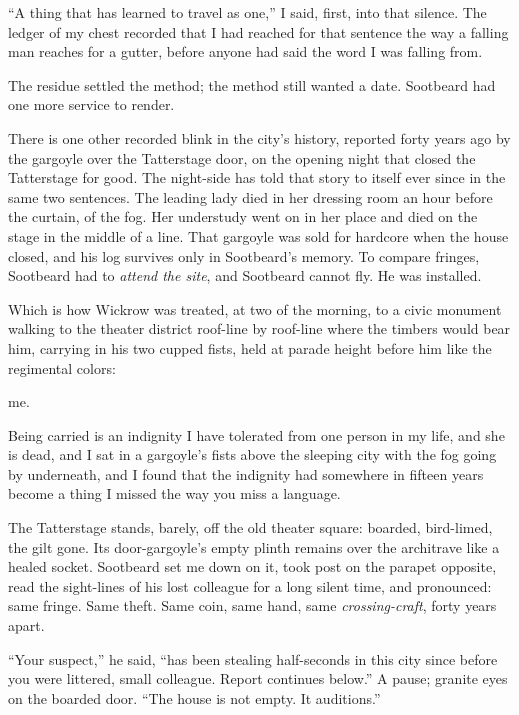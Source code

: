 ``A thing that has learned to travel as one,'' I said, first, into that silence. The ledger of my chest recorded that I had reached for that sentence the way a falling man reaches for a gutter, before anyone had said the word I was falling from.

\scenebreak

The residue settled the method; the method still wanted a date. Sootbeard had one more service to render.

There is one other recorded blink in the city's history, reported forty years ago by the gargoyle over the Tatterstage door, on the opening night that closed the Tatterstage for good. The night-side has told that story to itself ever since in the same two sentences. The leading lady died in her dressing room an hour before the curtain, of the fog. Her understudy went on in her place and died on the stage in the middle of a line. That gargoyle was sold for hardcore when the house closed, and his log survives only in Sootbeard's memory. To compare fringes, Sootbeard had to \emph{attend the site}, and Sootbeard cannot fly. He was installed.

Which is how Wickrow was treated, at two of the morning, to a civic monument walking to the theater district roof-line by roof-line where the timbers would bear him, carrying in his two cupped fists, held at parade height before him like the regimental colors:

me.

Being carried is an indignity I have tolerated from one person in my life, and she is dead, and I sat in a gargoyle's fists above the sleeping city with the fog going by underneath, and I found that the indignity had somewhere in fifteen years become a thing I missed the way you miss a language.

The Tatterstage stands, barely, off the old theater square: boarded, bird-limed, the gilt gone. Its door-gargoyle's empty plinth remains over the architrave like a healed socket. Sootbeard set me down on it, took post on the parapet opposite, read the sight-lines of his lost colleague for a long silent time, and pronounced: same fringe. Same theft. Same coin, same hand, same \emph{crossing-craft}, forty years apart.

``Your suspect,'' he said, ``has been stealing half-seconds in this city since before you were littered, small colleague. Report continues below.'' A pause; granite eyes on the boarded door. ``The house is not empty. It auditions.''

\scenebreak

